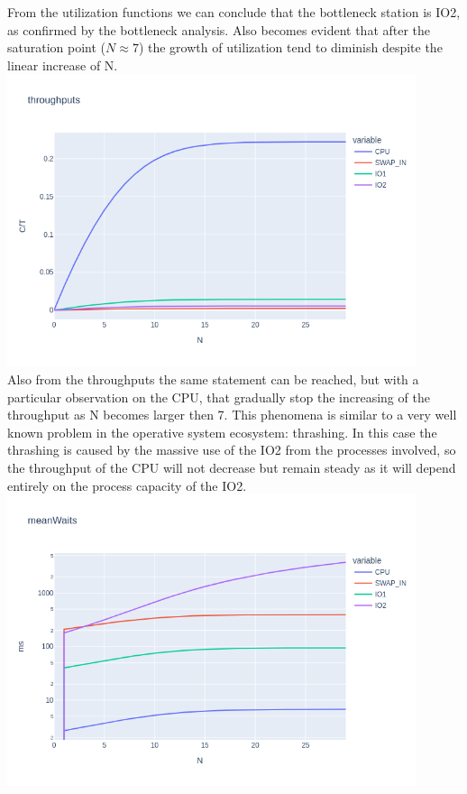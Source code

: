 \documentclass[12pt,a4paper]{article}
\begin{document}
    From the utilization functions we can conclude that the bottleneck station is IO2, as confirmed by the bottleneck analysis. Also becomes evident that after the saturation point ($N \approx7$) the growth of utilization tend to diminish despite the linear increase of N.
    \\
    \includegraphics[width=0.9\textwidth]{Images/throughputs.png}
    \\
    Also from the throughputs the same statement can be reached, but with a particular observation on the CPU, that gradually stop the increasing of the throughput as N becomes larger then 7. This phenomena is similar to a very well known problem in the operative system ecosystem: thrashing. In this case the thrashing is caused by the massive use of the IO2 from the processes involved, so the throughput of the CPU will not decrease but remain steady as it will depend entirely on the process capacity of the IO2. 
    \\
    \includegraphics[width=0.9\textwidth]{Images/meanWaits.png}
\end{document}
